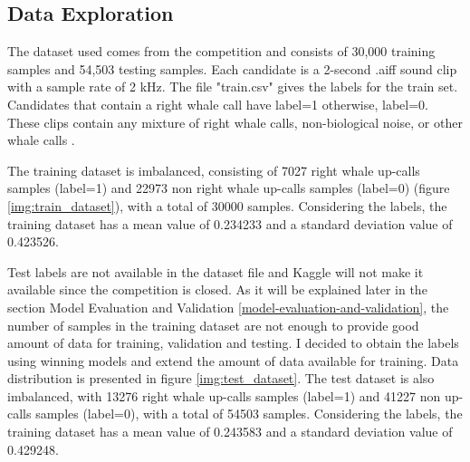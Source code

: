 \documentclass[]{article}
\begin{document}
\subsection{Data Exploration}\label{data-exploration}

The dataset used comes from the competition and consists of 30,000 training samples and 54,503 testing samples. Each candidate is a 2-second .aiff sound clip with a sample rate of 2 kHz. The file "train.csv" gives the labels for the train set. Candidates that contain a right whale call have label=1 otherwise, label=0. These clips contain any mixture of right whale calls, non-biological noise, or other whale calls \cite{CornellWeb, CornellWeb2}. 

The training dataset is imbalanced, consisting of 7027 right whale up-calls samples (label=1) and 22973 non right whale up-calls samples (label=0) (figure \ref{img:train_dataset}), with a total of 30000 samples. Considering the labels, the training dataset has a mean value of 0.234233 and a standard deviation value of 0.423526.

Test labels are not available in the dataset file and Kaggle will not make it available since the competition is closed. As it will be explained later in the section Model Evaluation and Validation \ref{model-evaluation-and-validation}, the number of samples in the training dataset are not enough to provide good amount of data for training, validation and testing. I decided to obtain the labels using winning models and extend the amount of data available for training. Data distribution is presented in figure \ref{img:test_dataset}. The test dataset is also imbalanced, with 13276 right whale up-calls samples (label=1) and 41227 non up-calls samples (label=0), with a total of 54503 samples. Considering the labels, the training dataset has a mean value of 0.243583 and a standard deviation value of 0.429248.
\end{document}
